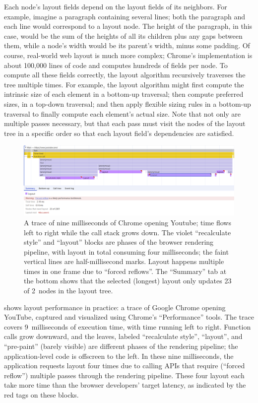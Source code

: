 Each node's layout fields depend on the layout fields
  of its neighbors.
For example, imagine a paragraph containing several lines;
  both the paragraph and each line would correspond
  to a layout node.
The height of the paragraph, in this case,
  would be the sum of the heights of all its children
  plus any gaps between them,
  while a node's width would be its parent's width,
  minus some padding.
Of course, real-world web layout is much more complex;
  Chrome's implementation is about 100,000 lines of code
  and computes hundreds of fields per node.
To compute all these fields correctly, the layout algorithm
  recursively traverses the tree multiple times.
For example, the layout algorithm might first compute
  the intrinsic size of each element in a bottom-up traversal;
  then compute preferred sizes, in a top-down traversal;
  and then apply flexible sizing rules in a bottom-up traversal
  to finally compute each element's actual size.
Note that not only are multiple passes necessary,
  but that each pass must visit the nodes of the layout tree
  in a specific order so that each layout field's dependencies
  are satisfied.

\begin{figure}
    \centering
    \includegraphics[width=\linewidth]{profile.png}
    \caption{
      A trace of nine milliseconds of Chrome opening Youtube;
        time flows left to right while the call stack grows down.
      The violet ``recalculate style'' and ``layout'' blocks
        are phases of the browser rendering pipeline,
        with layout in total consuming four milliseconds;
        the faint vertical lines are half-millisecond marks.
      Layout happens multiple times in one frame
        due to ``forced reflows''.
      The ``Summary'' tab at the bottom shows
        that the selected (longest) layout
        only updates 23 of 2~nodes
        in the layout tree.}
    \label{fig:profile}
\end{figure}

 shows layout performance in practice:
  a trace of Google Chrome opening YouTube,
  captured and visualized using Chrome's ``Performance'' tools.
The trace covers 9~milliseconds of execution time,
  with time running left to right.
Function calls grow downward, and the leaves,
  labeled ``recalculate style'', ``layout'',
  and ``pre-paint'' (barely visible)
  are different phases of the rendering pipeline;
  the application-level code is offscreen to the left.
In these nine milliseconds,
  the application requests layout four times
  due to calling APIs that require (``forced reflow'')
  multiple passes through the rendering pipeline.
These four layout each take more time than
  the browser developers' target latency,
  as indicated by the red tags on these blocks.

